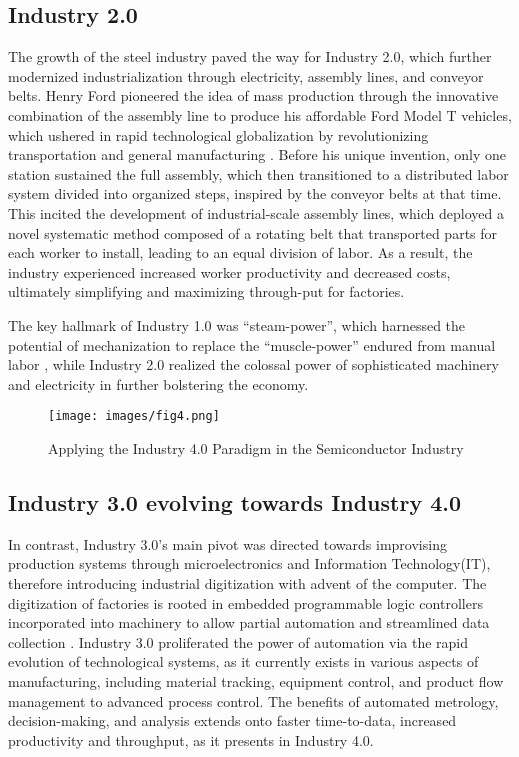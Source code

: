 \subsection{Industry 2.0}\label{sec3_2:industry_2}
The growth of the steel industry paved the way for Industry 2.0, which further modernized industrialization through electricity, assembly lines, and conveyor belts. Henry Ford pioneered the idea of mass production through the innovative combination of the assembly line to produce his affordable Ford Model T vehicles, which ushered in rapid technological globalization by revolutionizing transportation and general manufacturing \cite{model_2020}. Before his unique invention, only one station sustained the full assembly, which then transitioned to a distributed labor system divided into organized steps, inspired by the conveyor belts at that time. This incited the development of industrial-scale assembly lines, which deployed a novel systematic method composed of a rotating belt that transported parts for each worker to install, leading to an equal division of labor. As a result, the industry experienced increased worker productivity and decreased costs, ultimately simplifying and maximizing through-put for factories. 


The key hallmark of Industry 1.0 was ``steam-power”, which harnessed the potential of mechanization to replace the ``muscle-power” endured from manual labor \cite{Wan2022TheRT}, while Industry 2.0 realized the colossal power of sophisticated machinery and electricity in further bolstering the economy.

\begin{figure*}
    \centering
    \texttt{[image: images/fig4.png]}
    \caption{Applying the Industry 4.0 Paradigm in the Semiconductor Industry}
    \label{fig:4}
\end{figure*}

\subsection{Industry 3.0 evolving towards Industry 4.0}\label{sec3_3:industry_3_to_4}
In contrast, Industry 3.0’s main pivot was directed towards improvising production systems through microelectronics and Information Technology(IT), therefore introducing industrial digitization with advent of the computer. The digitization of factories is rooted in embedded programmable logic controllers incorporated into machinery to allow partial automation and streamlined data collection \cite{industry_4}. Industry 3.0 proliferated the power of automation via the rapid evolution of technological systems, as it currently exists in various aspects of manufacturing, including material tracking, equipment control, and product flow management to advanced process control. The benefits of automated metrology, decision-making, and analysis extends onto faster time-to-data, increased productivity and throughput, as it presents in Industry 4.0.

